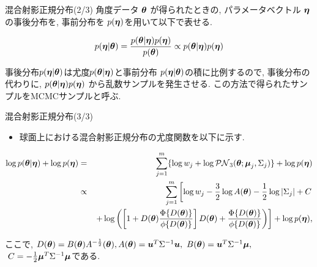 \documentclass[dvipdfmx]{beamer} %
\newcommand{\bm}[1]{\mbox{\boldmath $#1$}}
\begin{document}
\begin{frame}{混合射影正規分布(2/3)}
角度データ $\bm \theta$ が得られたときの, パラメータベクトル $\bm \eta$の事後分布を, 事前分布を $p(\bm \eta)$を用いて以下で表せる.

\begin{eqnarray*}
\label{BAYES}
p(\bm \eta | \bm \theta) = \frac{p(\bm \theta | \bm \eta) p(\bm \eta)}{p(\bm \theta)} \propto p(\bm \theta | \bm \eta) p(\bm \eta)
\end{eqnarray*}

\noindent
事後分布$p(\bm \eta | \bm \theta)$は尤度$p(\bm \theta | \bm \eta)$と事前分布 $p(\bm \eta| \bm \theta)$の積に比例するので, 事後分布の代わりに, $p(\bm \theta | \bm \eta) p(\bm \eta)$ から乱数サンプルを発生させる. この方法で得られたサンプルをMCMCサンプルと呼ぶ. 
\end{frame}
\begin{frame}{混合射影正規分布(3/3)}

\begin{itemize}
	\item 球面上における混合射影正規分布の尤度関数を以下に示す.
\end{itemize}

\vspace{-0.5cm}
\footnotesize %
\begin{eqnarray*}
\label{logPNS}
\log p(\bm \theta | \bm \eta) + \log p(\bm \eta) &=& \sum^m_{j=1} \{\log w_j + \log \mathcal{PN}_3(\bm \theta;\bm \mu_j, \Sigma_j)\} + \log p(\bm \eta) \\
&\propto& \sum^m_{j=1} \left[ \log w_j - \frac{3}{2} \log A(\bm \theta) - \frac{1}{2} \log |\Sigma_j| + C \right. \\
&&\left. + \log \left( \left[1 + D(\bm \theta) \frac{\Phi \{D(\bm \theta)\}}{\phi \{D(\bm \theta)\}} \right] D(\bm \theta) + \frac{\Phi \{D(\bm \theta)\}}{\phi \{D(\bm \theta)\}} \right) \right] + \log p(\bm \eta), 
\end{eqnarray*}
\normalsize

\noindent
ここで, $D(\bm \theta) = B(\bm \theta) A^{-\frac{1}{2}}(\bm \theta),
A(\bm \theta) = \bm u^T \Sigma^{-1} \bm u,\ B(\bm \theta) = \bm u^T \Sigma^{-1} \bm \mu,$ $\ C = -\frac{1}{2} \bm \mu^T \Sigma^{-1} \bm \mu$である.
\end{frame}

\end{document}
